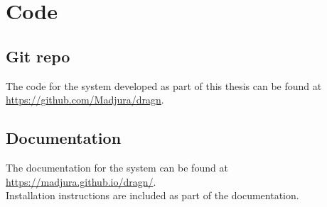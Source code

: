 \chapter{Code}
\label{chapter:code}
\section{Git repo}
The code for the system developed as part of this thesis can be found at \\
\url{https://github.com/Madjura/dragn}.

\section{Documentation}
The documentation for the system can be found at \url{https://madjura.github.io/dragn/}.\\
Installation instructions are included as part of the documentation.
